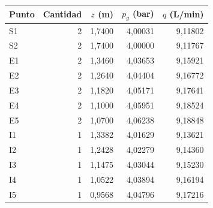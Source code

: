 \begin{tabular}{@{}lrrrr@{}}
\toprule
Punto & Cantidad & $z$ (m) & $p_g$ (bar) & $q$ (L/min)\\\midrule
S1 & 2 & 1{,}7400 & 4{,}00031 & 9{,}11802\\
S2 & 2 & 1{,}7400 & 4{,}00000 & 9{,}11767\\
E1 & 2 & 1{,}3460 & 4{,}03653 & 9{,}15921\\
E2 & 2 & 1{,}2640 & 4{,}04404 & 9{,}16772\\
E3 & 2 & 1{,}1820 & 4{,}05171 & 9{,}17641\\
E4 & 2 & 1{,}1000 & 4{,}05951 & 9{,}18524\\
E5 & 2 & 1{,}0700 & 4{,}06238 & 9{,}18848\\
I1 & 1 & 1{,}3382 & 4{,}01629 & 9{,}13621\\
I2 & 1 & 1{,}2428 & 4{,}02279 & 9{,}14360\\
I3 & 1 & 1{,}1475 & 4{,}03044 & 9{,}15230\\
I4 & 1 & 1{,}0522 & 4{,}03894 & 9{,}16194\\
I5 & 1 & 0{,}9568 & 4{,}04796 & 9{,}17216\\
\bottomrule
\end{tabular}